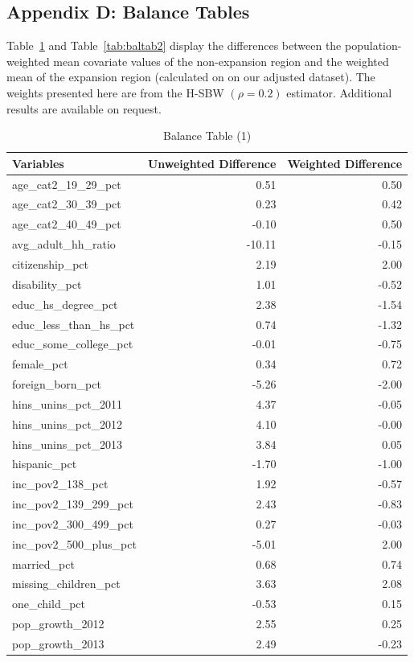 \documentclass[12pt]{article}
\begin{document}
\subsection{Appendix D: Balance Tables}

Table~\ref{tab:baltab1} and Table~\ref{tab:baltab2} display the differences between the population-weighted mean covariate values of the non-expansion region and the weighted mean of the expansion region (calculated on on our adjusted dataset). The weights presented here are from the H-SBW $(\rho = 0.2)$ estimator. Additional results are available on request.

\begin{table}[ht]
\centering
\begin{tabular}{lrr}
  \toprule
Variables & Unweighted Difference & Weighted Difference \\ 
  \midrule
age\_cat2\_19\_29\_pct & 0.51 & 0.50 \\ 
  age\_cat2\_30\_39\_pct & 0.23 & 0.42 \\ 
  age\_cat2\_40\_49\_pct & -0.10 & 0.50 \\ 
  avg\_adult\_hh\_ratio & -10.11 & -0.15 \\ 
  citizenship\_pct & 2.19 & 2.00 \\ 
  disability\_pct & 1.01 & -0.52 \\ 
  educ\_hs\_degree\_pct & 2.38 & -1.54 \\ 
  educ\_less\_than\_hs\_pct & 0.74 & -1.32 \\ 
  educ\_some\_college\_pct & -0.01 & -0.75 \\ 
  female\_pct & 0.34 & 0.72 \\ 
  foreign\_born\_pct & -5.26 & -2.00 \\ 
  hins\_unins\_pct\_2011 & 4.37 & -0.05 \\ 
  hins\_unins\_pct\_2012 & 4.10 & -0.00 \\ 
  hins\_unins\_pct\_2013 & 3.84 & 0.05 \\ 
  hispanic\_pct & -1.70 & -1.00 \\ 
  inc\_pov2\_138\_pct & 1.92 & -0.57 \\ 
  inc\_pov2\_139\_299\_pct & 2.43 & -0.83 \\ 
  inc\_pov2\_300\_499\_pct & 0.27 & -0.03 \\ 
  inc\_pov2\_500\_plus\_pct & -5.01 & 2.00 \\ 
  married\_pct & 0.68 & 0.74 \\ 
  missing\_children\_pct & 3.63 & 2.08 \\ 
  one\_child\_pct & -0.53 & 0.15 \\ 
  pop\_growth\_2012 & 2.55 & 0.25 \\ 
  pop\_growth\_2013 & 2.49 & -0.23 \\ 
   \bottomrule
    \end{tabular}
    \caption{Balance Table (1)}
    \label{tab:baltab1}
\end{table}
\end{document}
